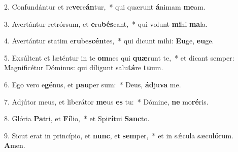 2. Confundántur et re\textbf{ve}re\textbf{án}tur,~*  qui quærunt \textbf{á}nimam \textbf{me}am.\

3. Avertántur retrórsum, et \textbf{e}ru\textbf{bés}cant,~*  qui volunt \textbf{mi}hi \textbf{ma}la.\

4. Avertántur statim e\textbf{ru}be\textbf{scén}tes,~*  qui dicunt mihi: \textbf{Eu}ge, \textbf{eu}ge.\

5. Exsúltent et læténtur in te \textbf{om}nes qui \textbf{quæ}runt te,~*  et dicant semper: Magnificétur Dóminus: qui díligunt salu\textbf{tá}re \textbf{tu}um.\

6. Ego vero e\textbf{gé}nus, et \textbf{pau}per sum:~*  Deus, \textbf{ád}ju\textbf{va} me.\

7. Adjútor meus, et liberátor \textbf{me}us \textbf{es} tu:~*  Dómine, \textbf{ne} mo\textbf{ré}ris.\

8. Glória \textbf{Pa}tri, et \textbf{Fí}lio,~*  et Spi\textbf{rí}tui \textbf{Sanc}to.\

9. Sicut erat in princípio, et \textbf{nunc}, et \textbf{sem}per,~*  et in sǽcula sæcu\textbf{ló}rum. \textbf{A}men.\

